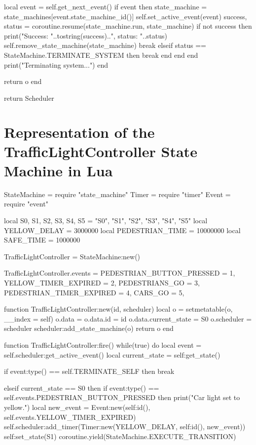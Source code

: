 \begin{appendices}
\begin{listing}[H]
\begin{luacode}
			local event = self.get_next_event()
			if event then
				state_machine = state_machines[event.state_machine_id()]
				self.set_active_event(event)
				success, status = coroutine.resume(state_machine.run, state_machine)
				if not success then
					print("Success: "..tostring(success)..", status: "..status)
					self.remove_state_machine(state_machine)
					break
				elseif status == StateMachine.TERMINATE_SYSTEM then
					break
				end
			end
		end
		print("Terminating system...")
	end

	return o
end

return Scheduler
\end{luacode}
\end{listing}

\chapter{Representation of the TrafficLightController State Machine in Lua}
\label{app:traffic_light}

\begin{luacode}
StateMachine = require "state_machine"
Timer = require "timer"
Event = require "event"

local S0, S1, S2, S3, S4, S5 = "S0", "S1", "S2", "S3", "S4", "S5"
local YELLOW_DELAY = 3000000
local PEDESTRIAN_TIME = 10000000
local SAFE_TIME = 1000000

TrafficLightController = StateMachine:new()

TrafficLightController.events = {
	PEDESTRIAN_BUTTON_PRESSED = 1,
	YELLOW_TIMER_EXPIRED = 2,
	PEDESTRIANS_GO = 3,
	PEDESTRIAN_TIMER_EXPIRED = 4,
	CARS_GO = 5,
}

function TrafficLightController:new(id, scheduler)
	local o = {}
	setmetatable(o, { __index = self})
	o.data = {}
	o.data.id = id
	o.data.current_state = S0
	o.scheduler = scheduler
	scheduler:add_state_machine(o)
	return o
end

function TrafficLightController:fire()
	while(true) do
		local event = self.scheduler:get_active_event()
		local current_state = self:get_state()

		if event:type() == self.TERMINATE_SELF then
			break

		elseif current_state == S0 then
			if event:type() == self.events.PEDESTRIAN_BUTTON_PRESSED then
				print("Car light set to yellow.")
				local new_event = Event:new(self:id(), self.events.YELLOW_TIMER_EXPIRED)
				self.scheduler:add_timer(Timer:new(YELLOW_DELAY, self:id(), new_event))
				self:set_state(S1)
				coroutine.yield(StateMachine.EXECUTE_TRANSITION)


\end{luacode}
\end{appendices}
